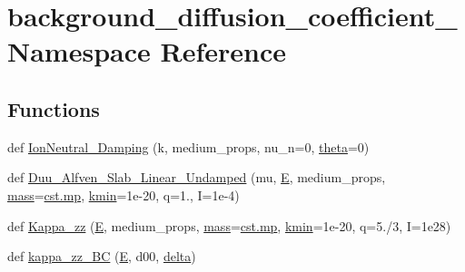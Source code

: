 \hypertarget{namespacebackground__diffusion__coefficient__3}{}\section{background\+\_\+diffusion\+\_\+coefficient\+\_ Namespace Reference}
\label{namespacebackground__diffusion__coefficient__3}
\subsection*{Functions}
\begin{DoxyCompactItemize}
\item 
def \hyperlink{namespacebackground__diffusion__coefficient__3_a8e2bcb655f88d8c1ad88bf28a6804b4c}{Ion\+Neutral\+\_\+\+Damping} (k, medium\+\_\+props, nu\+\_\+n=0, \hyperlink{cr__source_8h_a91a3bf9ce71325c8a7cbd31d8c474bff}{theta}=0)
\item 
def \hyperlink{namespacebackground__diffusion__coefficient__3_a669678cc75709e848975fe28609ced79}{Duu\+\_\+\+Alfven\+\_\+\+Slab\+\_\+\+Linear\+\_\+\+Undamped} (mu, \hyperlink{namespacebackground__diffusion__coefficient__3_a1058d24f7b8074e2f1e48e5031b4ceac}{E}, medium\+\_\+props, \hyperlink{namespacebackground__diffusion__coefficient__3_a371923684d4677ca28f5b051f0a53350}{mass}=\hyperlink{constants_8h_a6b331c08a80ed71d31c55a3341776483}{cst.\+mp}, \hyperlink{namespacebackground__diffusion__coefficient__3_a044fed0ffa9bb1f8e2e56a47d011c6c4}{kmin}=1e-\/20, q=1., I=1e-\/4)
\item 
def \hyperlink{namespacebackground__diffusion__coefficient__3_a6fb6ea45313c3886a4b1d0d34fff498d}{Kappa\+\_\+zz} (\hyperlink{namespacebackground__diffusion__coefficient__3_a1058d24f7b8074e2f1e48e5031b4ceac}{E}, medium\+\_\+props, \hyperlink{namespacebackground__diffusion__coefficient__3_a371923684d4677ca28f5b051f0a53350}{mass}=\hyperlink{constants_8h_a6b331c08a80ed71d31c55a3341776483}{cst.\+mp}, \hyperlink{namespacebackground__diffusion__coefficient__3_a044fed0ffa9bb1f8e2e56a47d011c6c4}{kmin}=1e-\/20, q=5./3, I=1e28)
\item 
def \hyperlink{namespacebackground__diffusion__coefficient__3_a10fb81ef6f3b3cf86b94cf348e5a2c4e}{kappa\+\_\+zz\+\_\+\+BC} (\hyperlink{namespacebackground__diffusion__coefficient__3_a1058d24f7b8074e2f1e48e5031b4ceac}{E}, d00, \hyperlink{constants_8h_a80a3c65c6b77216165fc34c12d0744e9}{delta})
\end{DoxyCompactItemize}
